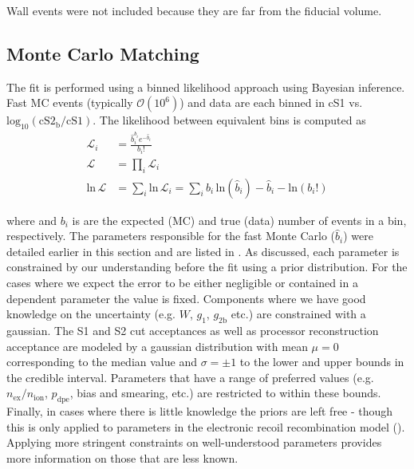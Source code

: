 Wall events were not included because they are far from the fiducial volume.



\subsection{Monte Carlo Matching}
\label{subsec:er_nr_calibrations_parameter_determ_mc_match}
The fit is performed using a binned likelihood approach using Bayesian inference.  Fast MC events (typically $\mathcal{O}(10^6)$) and
data are each binned in cS1 vs. $\mathrm{log_{10}(cS2_b / cS1)}$.  The likelihood between equivalent bins \li is computed as
\begin{subequations}
\begin{align}
\mathcal{L}_i &=\frac{\hat{b}_{i}^{b_i} e^{-\hat{b}_{i}}}{b_{i}!} \\
\mathcal{L} &= \prod_i \mathcal{L}_i \\
\mathrm{ln}\, \mathcal{L} &= \sum_i \mathrm{ln}\, \mathcal{L}_i = \sum_i b_i\, \mathrm{ln} (\hat{b}_i) - \hat{b}_i - \mathrm{ln} (b_i !)
\end{align}
\end{subequations}

\noindent where \bhi and $b_i$ is are the expected (MC) and true (data) number of events in a bin, respectively.  The parameters
responsible for the fast Monte Carlo ($\hat{b}_i$) were detailed earlier in this section and are listed in
.  As discussed, each parameter is constrained by our understanding before
the fit using a prior distribution.  For the cases where we expect the error to be either negligible or contained in a dependent parameter
the value is fixed.  Components where we have good knowledge on the uncertainty (e.g. $W$, $g_1$, $g_{2\mathrm{b}}$ etc.) are constrained
with a gaussian.  The S1 and S2 cut acceptances as well as processor reconstruction acceptance are modeled by a gaussian distribution with
mean $\mu = 0$ corresponding to the median value and $\sigma = \pm 1$ to the lower and upper bounds in the credible interval.  Parameters
that have a range of preferred values (e.g. $n_{\mathrm{ex}} / n_{\mathrm{ion}}$, $p_{\mathrm{dpe}}$,
bias and smearing, etc.) are restricted to within these bounds.  Finally, in cases where there is little knowledge the priors
are left free - though this is only applied to parameters in the electronic recoil recombination model
().  Applying more stringent constraints on well-understood parameters provides
more information on those that are less known.

